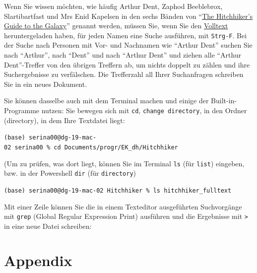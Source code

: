 \documentclass[
  letterpaper,
]{book}
\begin{document}
Wenn Sie wissen möchten, wie häufig Arthur Dent, Zaphod Beeblebrox,
Slartibartfast und Mrs Enid Kapelsen in den sechs Bänden von
``\href{https://en.wikipedia.org/wiki/The_Hitchhiker\%27s_Guide_to_the_Galaxy}{The
Hitchhiker's Guide to the Galaxy}'' genannt werden, müssen Sie, wenn Sie
den
\href{https://archive.org/stream/TheultimateHitchhikersGuide/The\%20Hitchhiker\%27s\%20Guide\%20To\%20The\%20Galaxy_djvu.txt}{Volltext}
heruntergeladen haben, für jeden Namen eine Suche ausführen, mit
\texttt{Strg-F}. Bei der Suche nach Personen mit Vor- und Nachnamen wie
``Arthur Dent'' suchen Sie nach ``Arthur'', nach ``Dent'' und nach
``Arthur Dent'' und ziehen alle ``Arthur Dent''-Treffer von den übrigen
Treffern ab, um nichts doppelt zu zählen und ihre Suchergebnisse zu
verfälschen. Die Trefferzahl all Ihrer Suchanfragen schreiben Sie in ein
neues Dokument.

Sie können dasselbe auch mit dem Terminal machen und einige der
Built-in-Programme nutzen: Sie bewegen sich mit \texttt{cd},
\texttt{change\ directory}, in den Ordner (directory), in dem Ihre
Textdatei liegt:

\texttt{(base)\ serina00@dg-19-mac-02\ serina00\ \%\ cd\ Documents/progr/EK\_dh/Hitchhiker}

(Um zu prüfen, was dort liegt, können Sie im Terminal \texttt{ls} (für
\texttt{list}) eingeben, bzw. in der Powershell \texttt{dir} (für
\texttt{directory})

\texttt{(base)\ serina00@dg-19-mac-02\ Hitchhiker\ \%\ ls\ hitchhiker\_fulltext}

Mit einer Zeile können Sie die in einem Texteditor ausgeführten
Suchvorgänge mit \texttt{grep} (Global Regular Expression Print)
ausführen und die Ergebnisse mit \texttt{\textgreater{}} in eine neue
Datei schreiben:

\appendix
{}

\hypertarget{appendix}{%
\chapter{Appendix}\label{appendix}}
\end{document}
